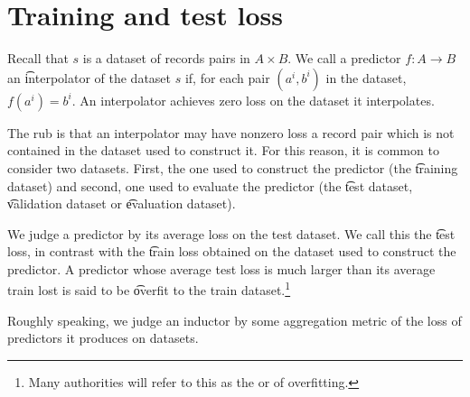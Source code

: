 \section*{Training and test loss}

Recall that $s$ is a dataset of records pairs in $A \times B$.
We call a predictor $f: A \to B$ an \t{interpolator} of the dataset $s$ if, for each pair $(a^i, b^i)$ in the dataset, $f(a^i) = b^i$.
An interpolator achieves zero loss on the dataset it interpolates.

The rub is that an interpolator may have nonzero loss a record pair which is not contained in the dataset used to construct it.
For this reason, it is common to consider two datasets.
First, the one used to construct the predictor (the \t{training dataset}) and second, one used to evaluate the predictor (the \t{test dataset}, \t{validation dataset} or \t{evaluation dataset}).

We judge a predictor by its average loss on the test dataset.
We call this the \t{test loss}, in contrast with the \t{train loss} obtained on the dataset used to construct the predictor.
A predictor whose average test loss is much larger than its average train lost is said to be \t{overfit} to the train dataset.\footnote{Many authorities will refer to this as the  or  of overfitting.}

Roughly speaking, we judge an inductor by some aggregation metric of the loss of predictors it produces on datasets.

